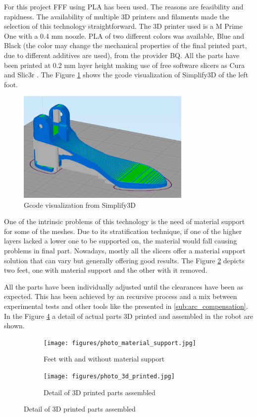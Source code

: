 For this project FFF using PLA has been used.
The reasons are feasibility and rapidness.
The availability of multiple 3D printers and filaments made the selection of this technology straightforward.
The 3D printer used is a M Prime One \cite{m_prime_one} with a 0.4 mm noozle.
PLA of two different colors was available, Blue and Black (the color may change the mechanical properties of the final printed part, due to different additives are used), from the provider BQ.
All the parts have been printed at 0.2 mm layer height making use of free software slicers as Cura \cite{cura} and Slic3r \cite{slic3r}.
The Figure \ref{fig:3d_printing_gcode} shows the gcode visualization of Simplify3D \cite{simplify3d} of the left foot.
\begin{figure}[htb]
  \centering
  \includegraphics[width=0.75\textwidth]{figures/3d_printing_gcode}
  \caption{Gcode visualization from Simplify3D \cite{simplify3d}}
  \label{fig:3d_printing_gcode}
\end{figure}
One of the intrinsic problems of this technology is the need of material support for some of the meshes.
Due to its stratification technique, if one of the higher layers lacked a lower one to be supported on, the material would fall causing problems in final part.
Nowadays, mostly all the slicers offer a material support solution that can vary but generally offering good results.
The Figure \ref{fig:photo_material_support} depicts two feet, one with material support and the other with it removed.

All the parts have been individually adjusted until the clearances have been as expected.
This has been achieved by an recursive process and a mix between experimental tests and other tools like the presented in \ref{sub:arc_compensation}.
In the Figure \ref{fig:photo_3d_printed} a detail of actual parts 3D printed and assembled in the robot are shown.

\begin{figure}[ht]
    \centering
    \begin{subfigure}[b]{0.49\textwidth}
        \texttt{[image: figures/photo\_material\_support.jpg]}
        \caption{Feet with and without material support}
        \label{fig:photo_material_support}
    \end{subfigure}
    \begin{subfigure}[b]{0.49\textwidth}
        \texttt{[image: figures/photo\_3d\_printed.jpg]}
        \caption{Detail of 3D printed parts assembled}
        \label{fig:photo_3d_printed}
    \end{subfigure}
\end{figure}

